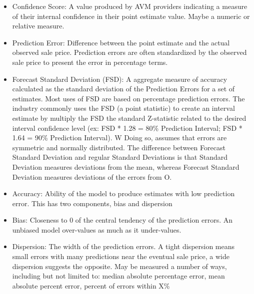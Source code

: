 \documentclass[colTwo]{anon}
\theoremstyle{definition}
\begin{document}
\begin{itemize}
\item Confidence Score: A value produced by AVM providers indicating a measure of their internal confidence in their point estimate value.  Maybe a numeric or relative measure. 
\item Prediction Error: Difference between the point estimate and the actual observed sale price. Prediction errors are often standardized by the observed sale price to present the error in percentage terms.
\item Forecast Standard Deviation (FSD):  A aggregate measure of accuracy calculated as the standard deviation of the Prediction Errors for a set of estimates. Most uses of FSD are based on percentage prediction errors. The industry commonly uses the FSD (a point statistic) to create an interval estimate by multiply the FSD the standard Z-statistic related to the desired interval confidence level (ex: FSD * 1.28 = 80\% Prediction Interval; FSD * 1.64 = 90\% Prediction Interval). W Doing so, assumes that errors are symmetric and normally distributed. The difference between Forecast Standard Deviation and regular Standard Deviations is that Standard Deviation measures deviations from the mean, whereas Forecast Standard Deviation measures deviations of the errors from O.
\item Accuracy: Ability of the model to produce estimates with low prediction error.  This has two components, bias and dispersion
\item Bias: Closeness to 0 of the central tendency of the prediction errors.  An unbiased model over-values as much as it under-values.  
\item Dispersion: The width of the prediction errors.  A tight dispersion means small errors with many predictions near the eventual sale price, a wide dispersion suggests the opposite.  May be measured a number of ways, including but not limited to: median absolute percentage error, mean absolute percent error, percent of errors within X\%
\end{itemize}
\end{document}
